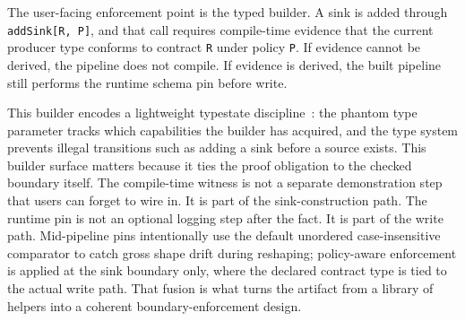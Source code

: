 The user-facing enforcement point is the typed builder. A sink is added through \texttt{addSink[R, P]}, and that call requires compile-time evidence that the current producer type conforms to contract \texttt{R} under policy \texttt{P}. If evidence cannot be derived, the pipeline does not compile. If evidence is derived, the built pipeline still performs the runtime schema pin before write.

This builder encodes a lightweight typestate discipline~\cite{aldrich_typestate_2009}: the phantom type parameter tracks which capabilities the builder has acquired, and the type system prevents illegal transitions such as adding a sink before a source exists. This builder surface matters because it ties the proof obligation to the checked boundary itself. The compile-time witness is not a separate demonstration step that users can forget to wire in. It is part of the sink-construction path. The runtime pin is not an optional logging step after the fact. It is part of the write path. Mid-pipeline pins intentionally use the default unordered case-insensitive comparator to catch gross shape drift during reshaping; policy-aware enforcement is applied at the sink boundary only, where the declared contract type is tied to the actual write path. That fusion is what turns the artifact from a library of helpers into a coherent boundary-enforcement design.
